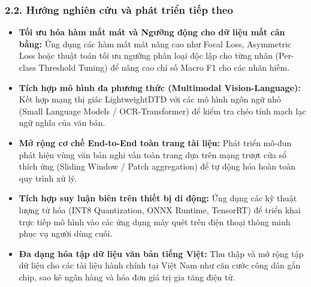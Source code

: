 \subsubsection{2.2. Hướng nghiên cứu và phát triển tiếp theo}
\begin{itemize}[label={--}, itemsep=2pt]
    \item \textbf{Tối ưu hóa hàm mất mát và Ngưỡng động cho dữ liệu mất cân bằng:} Ứng dụng các hàm mất mát nâng cao như Focal Loss, Asymmetric Loss hoặc thuật toán tối ưu ngưỡng phân loại độc lập cho từng nhãn (Per-class Threshold Tuning) để nâng cao chỉ số Macro F1 cho các nhãn hiếm.
    \item \textbf{Tích hợp mô hình đa phương thức (Multimodal Vision-Language):} Kết hợp mạng thị giác LightweightDTD với các mô hình ngôn ngữ nhỏ (Small Language Models / OCR-Transformer) để kiểm tra chéo tính mạch lạc ngữ nghĩa của văn bản.
    \item \textbf{Mở rộng cơ chế End-to-End toàn trang tài liệu:} Phát triển mô-đun phát hiện vùng văn bản nghi vấn toàn trang dựa trên mạng trượt cửa sổ thích ứng (Sliding Window / Patch aggregation) để tự động hóa hoàn toàn quy trình xử lý.
    \item \textbf{Tích hợp suy luận biên trên thiết bị di động:} Ứng dụng các kỹ thuật lượng tử hóa (INT8 Quantization, ONNX Runtime, TensorRT) để triển khai trực tiếp mô hình vào các ứng dụng máy quét trên điện thoại thông minh phục vụ người dùng cuối.
    \item \textbf{Đa dạng hóa tập dữ liệu văn bản tiếng Việt:} Thu thập và mở rộng tập dữ liệu cho các tài liệu hành chính tại Việt Nam như căn cước công dân gắn chip, sao kê ngân hàng và hóa đơn giá trị gia tăng điện tử.
\end{itemize}
